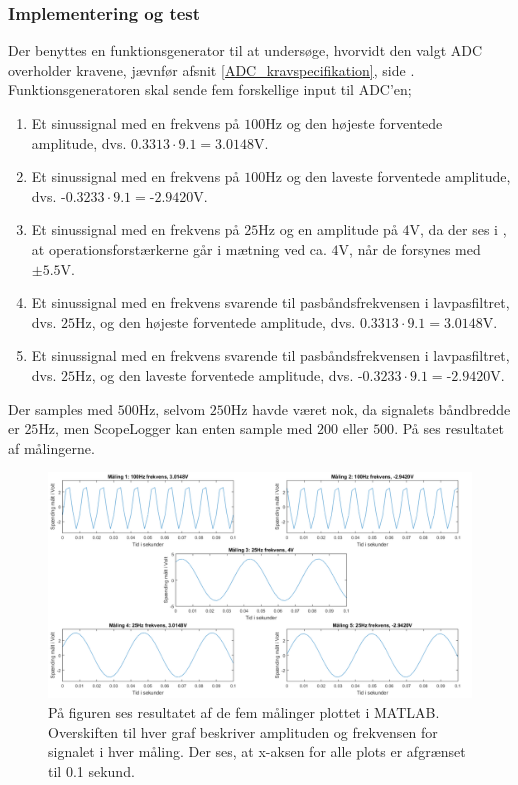 \subsubsection{Implementering og test}
Der benyttes en funktionsgenerator til at undersøge, hvorvidt den valgt ADC overholder kravene, jævnfør afsnit \ref{ADC_kravspecifikation}, side \pageref{ADC_kravspecifikation}. Funktionsgeneratoren skal sende fem forskellige input til ADC'en;
\begin{enumerate}
	\item Et sinussignal med en frekvens på $100$Hz og den højeste forventede amplitude, dvs. $0.3313 \cdot 9.1 = 3.0148$V.
	\item Et sinussignal med en frekvens på $100$Hz og den laveste forventede amplitude, dvs. -$0.3233 \cdot 9.1 = $-$2.9420$V.
	\item Et sinussignal med en frekvens på $25$Hz og en amplitude på $4$V, da der ses i , at operationsforstærkerne går i mætning ved ca. $4$V, når de forsynes med $\pm5.5$V. 
	\item Et sinussignal med en frekvens svarende til pasbåndsfrekvensen i lavpasfiltret, dvs. $25$Hz, og den højeste forventede amplitude, dvs. $0.3313 \cdot 9.1 = 3.0148$V.
	\item Et sinussignal med en frekvens svarende til pasbåndsfrekvensen i lavpasfiltret, dvs. $25$Hz, og den laveste forventede amplitude, dvs. -$0.3233 \cdot 9.1 = $-$2.9420$V.
\end{enumerate}
\noindent Der samples med $500$Hz, selvom $250$Hz havde været nok, da signalets båndbredde er $25$Hz, men ScopeLogger kan enten sample med $200$ eller $500$. På  ses resultatet af målingerne.

\begin{figure}[H]
	\centering
	\includegraphics[scale=0.45]{figures/cProblemloesning/ADC_Test3_matlab.PNG}
	\caption{På figuren ses resultatet af de fem målinger plottet i MATLAB. Overskiften til hver graf beskriver amplituden og frekvensen for signalet i hver måling. Der ses, at x-aksen for alle plots er afgrænset til 0.1 sekund.}
	\label{fig:ADC_Test}
\end{figure}

